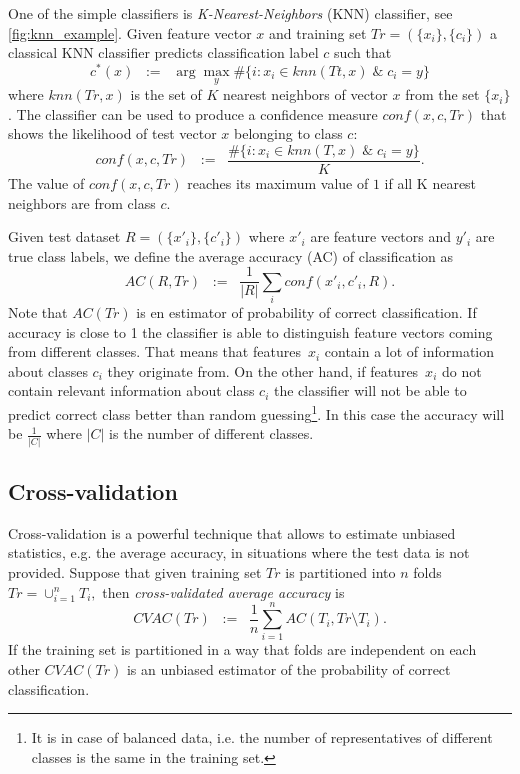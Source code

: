 \documentclass[paper=a4,fontsize=12pt]{scrartcl}
\numberwithin{equation}{section} %
\numberwithin{figure}{section} %
\numberwithin{table}{section} %
\begin{document}
One of the simple classifiers is \emph{ K-Nearest-Neighbors} (KNN) classifier, see \autoref{fig:knn_example}.
Given feature vector $x$ and training set $Tr=(\{x_i\},\{c_i\})$ a classical KNN classifier predicts classification label $c$ such that 
$$c^*(x)\;\; := \;\; \arg\max_y \#\{i : x_i \in knn(Tt,x) \;\&\; c_i=y \}$$ where $knn(Tr,x)$ is the set of $K$ nearest neighbors of vector $x$ from the set $\{x_i\}$. The classifier can be used to produce a confidence measure $conf(x,c,Tr)$ that shows the likelihood of test vector $x$ belonging to class $c$:
 $$ conf(x,c,Tr) \;\; := \;\; \frac{\#\{i : x_i \in knn(T,x) \;\&\; c_i=y \}}{K}. $$ The value of $conf(x,c,Tr)$ reaches its maximum value of $1$ if all K nearest neighbors are from class $c$. %

Given test dataset $R=(\{x'_i\},\{c'_i\})$ where $x'_i$ are feature vectors and $y'_i$ are true class labels, we define the average accuracy (AC) of classification as 
$$AC(R,Tr) \;\; := \;\; \frac1{|R|}\sum_i conf(x'_i, c'_i,R).$$
Note that $AC(Tr)$ is en estimator of probability of correct classification. If accuracy is close to 1 the classifier is able to distinguish feature vectors coming from different classes. That means that features~$x_i$ contain a lot of information about classes $c_i$ they originate from. On the other hand, if features~$x_i$ do not contain relevant information about class $c_i$ the classifier will not be able to predict correct class better than random guessing\footnote{It is in case of balanced data, i.e. the number of representatives of different classes is the same in the training set.}. In this case the accuracy will be $\frac1{|C|}$ where $|C|$ is the number of different classes. 

\subsection{Cross-validation}

\newcommand{\CVAC}{CV\!\!AC}

Cross-validation is a powerful technique that allows to estimate unbiased statistics, e.g. the average accuracy, in situations where the test data is not provided. Suppose that given training set $Tr$ is partitioned into $n$ folds $Tr=\cup_{i=1}^n T_i,$ then \emph{cross-validated average accuracy} is $$\CVAC(Tr) \;\; := \;\; \frac1n\sum_{i=1}^n AC(T_i,Tr \setminus T_i).$$ If the training set is partitioned in a way that folds are independent on each other $\CVAC(Tr)$ is an unbiased estimator of the probability of correct classification.
\end{document}
